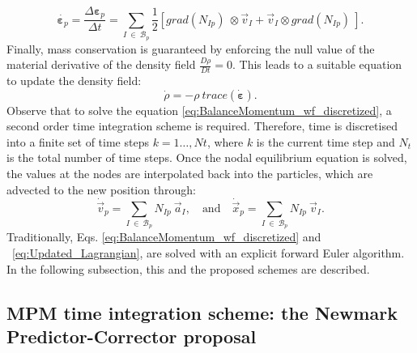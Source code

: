 \documentclass[preprint,12pt,a4paper]{elsarticle}
\newcommand{\tens}[1]{
  \ensuremath{\mathbf{{#1}}}
}
\newcommand\Grad[1]{grad({#1})}
\begin{document}
\begin{equation}
  \label{eq:IncrStrainPoint}
  \dot{\tens{\varepsilon}_{p}} = \frac{\Delta
    \tens{\varepsilon}_{p}}{\Delta t} = \sum_{I\ \in\ \mathcal{B}_p}
  \frac{1}{2} \left[\Grad{N_{Ip}}\ \otimes \vec{v}_{I} + \vec{v}_{I} \otimes
    \Grad{N_{Ip}}\ \right].
\end{equation}
Finally, mass conservation is guaranteed by enforcing the null value of
the material derivative of the density field $\frac{D \rho}{D t} = 0$.
This leads to a suitable equation to update the density field:
\begin{equation}
  \label{eq:MassConservation}
\dot{\rho} = - \rho\ \mathit{trace} \left( \dot{\tens{\varepsilon}} \right).
\end{equation}
Observe that to solve the equation \eqref{eq:BalanceMomentum_wf_discretized}, a second order time integration scheme is required. Therefore, time is
discretised into a finite set of time steps $k = 1\ldots ,Nt$, where $k$ is the current time step and $N_t$ is the total number of time steps. Once the nodal equilibrium equation is solved, the values at the nodes are interpolated back into the particles, which are advected
to the new position through:
\begin{equation}
  \label{eq:Updated_Lagrangian}
  \dot{\vec{v}}_p = \sum_{I\ \in\ \mathcal{B}_p} N_{Ip}\ \vec{a}_{I},\quad \text{and} \quad
  \dot{\vec{x}}_{p} = \sum_{I\ \in\ \mathcal{B}_p} N_{Ip}\ \vec{v}_{I}.  
\end{equation}
Traditionally, Eqs. \eqref{eq:BalanceMomentum_wf_discretized} and ~\eqref{eq:Updated_Lagrangian},
are solved with an explicit forward Euler algorithm. In the following subsection, this and the proposed schemes are described.

\subsection{MPM time integration scheme: the Newmark Predictor-Corrector proposal}
\label{sec:epc-algor-mpm}
\end{document}
